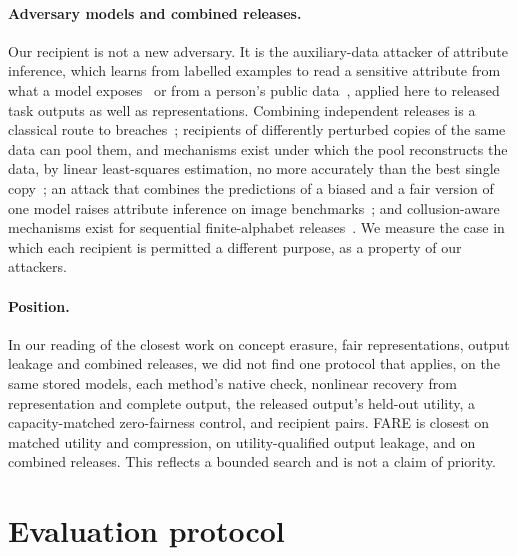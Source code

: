 \documentclass[10pt]{article}
\begin{document}
\paragraph{Adversary models and combined releases.} Our recipient is not a new adversary. It is the auxiliary-data
attacker of attribute inference, which learns from labelled examples to read a sensitive attribute from what a model
exposes~\citep{song2020overlearning} or from a person's public data~\citep{jia2018attriguard}, applied here to released
task outputs as well as representations. Combining independent releases is a classical route to breaches~\citep{ganta2008composition}; recipients
of differently perturbed copies of the same data can pool them, and mechanisms exist under which the pool reconstructs
the data, by linear least-squares estimation, no more accurately than the best single copy~\citep{li2012multilevel}; an
attack that combines the predictions of a biased and a fair version of one model raises attribute inference on image
benchmarks~\citep{tian2025fairnessprivacy}; and collusion-aware mechanisms exist
for sequential finite-alphabet releases~\citep{taylor2026collusion}. We measure the case in which each recipient is permitted a different purpose, as a property of our attackers.

\paragraph{Position.} In our reading of the closest work on concept erasure, fair representations, output leakage
and combined releases, we did not find one protocol that applies, on the same
stored models, each method's native check, nonlinear recovery from representation and complete output, the released
output's held-out utility, a capacity-matched zero-fairness control, and recipient pairs. FARE is closest on matched
utility and compression, \citet{wang2019balanced} on utility-qualified output leakage, and
\citet{tian2025fairnessprivacy} on combined releases. This reflects a bounded search and is not a claim of priority.

\section{Evaluation protocol}\label{sec:protocol}
\end{document}
